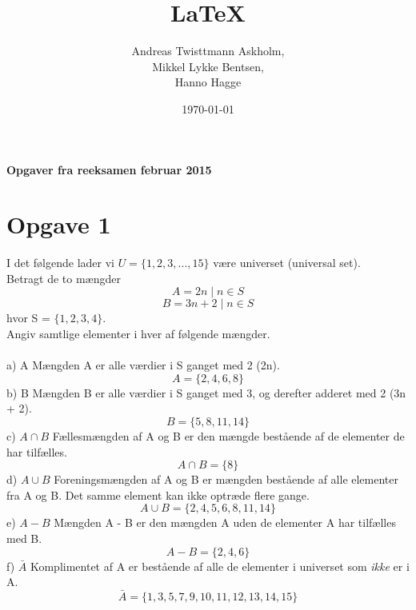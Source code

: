\documentclass[a4paper,12pt]{article}
\title{\LaTeX{}}
\author{Andreas Twisttmann Askholm, \\Mikkel Lykke Bentsen, \\Hanno Hagge}
\date{\today}
\begin{document}
\maketitle

\textbf{Opgaver fra reeksamen februar 2015}
\\ 
\section{Opgave 1}
I det følgende lader vi $U = \lbrace1, 2, 3, . . . , 15\rbrace$ være universet (universal set).\\
Betragt de to mængder\\
$$A = {2n \mid n \in S}$$
$$B = {3n + 2 \mid n \in S}$$
hvor S = $\lbrace1, 2, 3, 4\rbrace.$ \\
Angiv samtlige elementer i hver af følgende mængder.
\\\\
a) A  \hspace{5mm} Mængden A er alle værdier i  S ganget med 2 (2n).$$ A = \lbrace 2, 4, 6, 8\rbrace$$
b) B \hspace{5mm} Mængden B er alle værdier i S ganget med 3, og derefter adderet med 2 (3n + 2). $$ B = \lbrace 5, 8, 11, 14 \rbrace$$
c) $A \cap B$ \hspace{5mm} Fællesmængden af A og B er den mængde bestående af de elementer de har tilfælles. $$ A \cap B = \lbrace8\rbrace$$
d) $A \cup B$ \hspace{5mm} Foreningsmængden af A og B er mængden bestående af alle elementer fra A og B. Det samme element kan ikke optræde flere gange. $$ A \cup B = \lbrace 2, 4, 5, 6, 8, 11, 14\rbrace$$
e) $A - B$ \hspace{5mm} Mængden A - B er den mængden A uden de elementer A har tilfælles med B. $$ A - B = \lbrace 2, 4, 6 \rbrace $$
f) $ \bar{A}$ \hspace{5mm} Komplimentet af A er bestående af alle de elementer i universet som \emph{ikke} er i A. $$ \bar{A} = \lbrace 1, 3, 5, 7, 9, 10, 11, 12, 13, 14, 15 \rbrace$$
\end{document}
